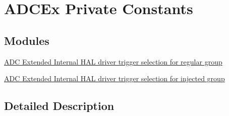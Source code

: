 \hypertarget{group___a_d_c_ex___private___constants}{}\section{A\+D\+C\+Ex Private Constants}
\label{group___a_d_c_ex___private___constants}
\subsection*{Modules}
\begin{DoxyCompactItemize}
\item 
\hyperlink{group___a_d_c_ex___internal___h_a_l__driver___ext__trig__src___regular}{A\+D\+C Extended Internal H\+A\+L driver trigger selection for regular group}
\item 
\hyperlink{group___a_d_c_ex___internal___h_a_l__driver___ext__trig__src___injected}{A\+D\+C Extended Internal H\+A\+L driver trigger selection for injected group}
\end{DoxyCompactItemize}


\subsection{Detailed Description}
